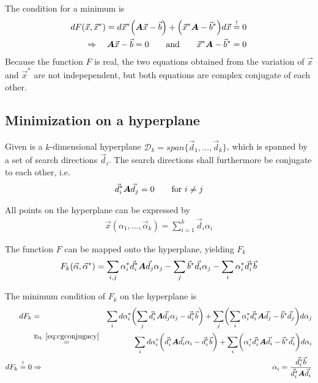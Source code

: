 \documentclass[11pt,a4paper]{report}
\begin{document}
The condition for a minimum is
\begin{eqnarray}
dF(\vec{x},\vec{x}^*)
=d\vec{x}^*\Bigl(\bm{A}\vec{x}-\vec{b}\Bigr)
+\Bigl(\vec{x}^*\bm{A}-\vec{b}^*\Bigr)d\vec{x}\stackrel{!}{=}0
\nonumber\\
\Rightarrow\quad
\bm{A}\vec{x}-\vec{b}=0\qquad\text{and}\qquad \vec{x}^*\bm{A}-\vec{b}^*=0
\end{eqnarray}
Because the function $F$ is real, the two equations obtained from the
variation of $\vec{x}$ and $\vec{x}^*$ are not indepependent, but both
equations are complex conjugate of each other.


\subsection{Minimization on a hyperplane}
Given is a $k$-dimensional hyperplane
$\mathcal{D}_k=span\{\vec{d}_1,\ldots,\vec{d}_k\}$, which is spanned
by a set of search directions $\vec{d}_i$. The search directions shall
furthermore be conjugate to each other, i.e.
\begin{eqnarray}
\vec{d}_i^*\bm{A}\vec{d}_j=0\qquad\text{for $i\neq j$}
\label{eq:cgconjugacy}
\end{eqnarray}

All points on the hyperplane can be expressed by
\begin{eqnarray}
\vec{x}(\alpha_1,\ldots,\vec{\alpha}_k)=\sum_{i=1}^k\vec{d}_i\alpha_i
\label{eq:cgxofpalpha}
\end{eqnarray}

The function $F$ can be mapped onto the hyperplane, yielding $F_k$
\begin{eqnarray}
F_k(\vec{\alpha},\vec{\alpha}^*)
=\sum_{i,j} \alpha_i^* \vec{d}^*_i\bm{A}\vec{d}_j\alpha_j
-\sum_j \vec{b}^*\vec{d}_i\alpha_j
-\sum_i \alpha_i^*\vec{d}^*_i\vec{b}
\end{eqnarray}

The minimum condition of $F_k$ on the hyperplane is
\begin{eqnarray}
dF_k
&=&\sum_id\alpha_i^*\biggl(\sum_{j}\vec{d}^*_i\mat{A}\vec{d}_j\alpha_j
-\vec{d}^*_i\vec{b}\biggr)
+\sum_{j} 
\biggl(\sum_{i} \alpha_i^* \vec{d}^*_i\mat{A}\vec{d}_j
-\vec{b}^*\vec{d}_j\biggr)d\alpha_j
\nonumber\\
&\eqrel{eq:cgconjugacy}{=}&
\sum_id\alpha_i^*\biggl(\vec{d}^*_i\mat{A}\vec{d}_i\alpha_i
-\vec{d}^*_i\vec{b}\biggr)
+\sum_{i} 
\biggl( \alpha_i^* \vec{d}^*_i\mat{A}\vec{d}_i
-\vec{b}^*\vec{d}_i\biggr)d\alpha_i
\nonumber\\
dF_k\stackrel{!}{=}0&\Rightarrow&
\alpha_i=\frac{\vec{d}^*_i\vec{b}}{\vec{d}^*_i\mat{A}\vec{d}_i}
\label{eq:cgalhaofab}
\end{eqnarray}
\end{document}
